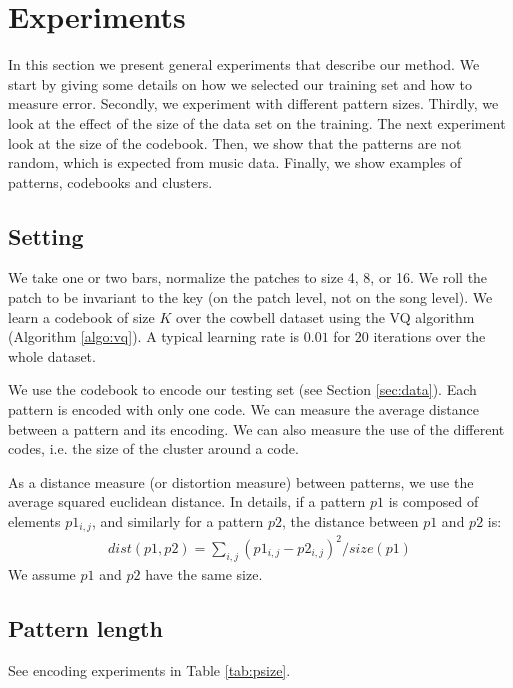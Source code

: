 \documentclass{article}
\begin{document}
\section{Experiments}\label{sec:experiments}
In this section we present general experiments that describe our method.
We start by giving some details on how we selected our training set and
how to measure error. Secondly, we experiment with different pattern sizes.
Thirdly, we look at the effect of the size of the
data set on the training. The next experiment look at the size of the
codebook. Then, we show that the patterns are not random,
which is expected from music data. Finally, we show examples of patterns,
codebooks and clusters.


\subsection{Setting}\label{ssec:setting}
We take one or two bars, normalize the patches to size 4, 8, or 16.
We roll the patch to be invariant to the key (on the patch level, not on
the song level). We learn a codebook of size $K$ over the cowbell dataset 
using the VQ algorithm (Algorithm \ref{algo:vq}). A typical learning rate 
is $0.01$ for $20$ iterations over the whole dataset.

We use the codebook to encode our testing set (see Section \ref{sec:data}).
Each pattern is encoded with only one code. We can measure the average
distance between a pattern and its encoding. We can also measure the use
of the different codes, i.e. the size of the cluster around a code.

As a distance measure (or distortion measure) between patterns, we use
the average squared euclidean distance. In details, if a pattern $p1$
is composed of elements $p1_{i,j}$, and similarly for a pattern $p2$,
the distance between $p1$ and $p2$ is:
\begin{eqnarray}
  dist(p1,p2) = \sum_{i,j} (p1_{i,j} - p2_{i,j})^2 / size(p1)  \label{eq:dist}
\end{eqnarray}
We assume $p1$ and $p2$ have the same size.

\subsection{Pattern length}
See encoding experiments in Table \ref{tab:psize}.
\end{document}
